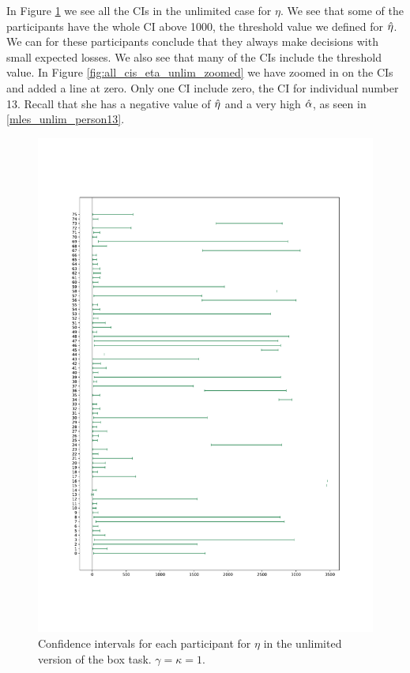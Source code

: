 In Figure \ref{fig:all_cis_eta_unlim_v2} we see all the CIs in the unlimited case for $\eta$. We see that some of the participants have the whole CI above 1000, the threshold value we defined for $\hat{\eta}$. We can for these participants conclude that they always make decisions with small expected losses. We also see that many of the CIs include the threshold value. In Figure \ref{fig:all_cis_eta_unlim_zoomed} we have zoomed in on the CIs and added a line at zero. Only one CI include zero, the CI for individual number 13. Recall that she has a negative value of $\hat{\eta}$ and a very high $\hat{\alpha}$, as seen in \eqref{mles_unlim_person13}.
\begin{figure}
    \centering
    \includegraphics[scale=0.37]{pictures/all_cis_unlim_eta_pdf.pdf}
    \caption[CIs for $\eta$, unlimited. $\gamma=\kappa=1$]{Confidence intervals for each participant for $\eta$ in the unlimited version of the box task. $\gamma=\kappa=1$.}
    \label{fig:all_cis_eta_unlim_v2}
\end{figure}

